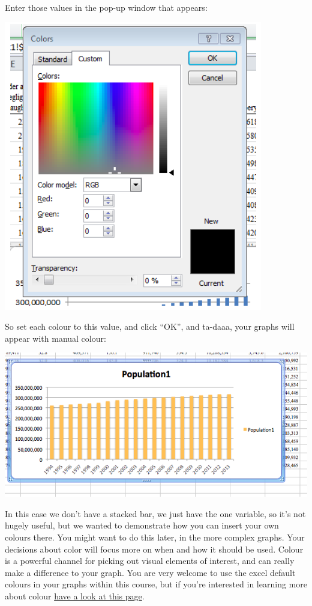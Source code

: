 \documentclass[
]{book}
\begin{document}
Enter those values in the pop-up window that appears:

\includegraphics{imgs/pc_rbg.png}

So set each colour to this value, and click ``OK'', and ta-daaa, your graphs will appear with manual colour:

\includegraphics{imgs/manual_fill_6.png}

In this case we don't have a stacked bar, we just have the one variable, so it's not hugely useful, but we wanted to demonstrate how you can insert your own colours there. You might want to do this later, in the more complex graphs. Your decisions about color will focus more on when and how it should be used. Colour is a powerful channel for picking out visual elements of interest, and can really make a difference to your graph. You are very welcome to use the excel default colours in your graphs within this course, but if you're interested in learning more about colour \href{https://lisacharlotterost.github.io/2016/04/22/Colors-for-DataVis/}{have a look at this page}.
\end{document}
